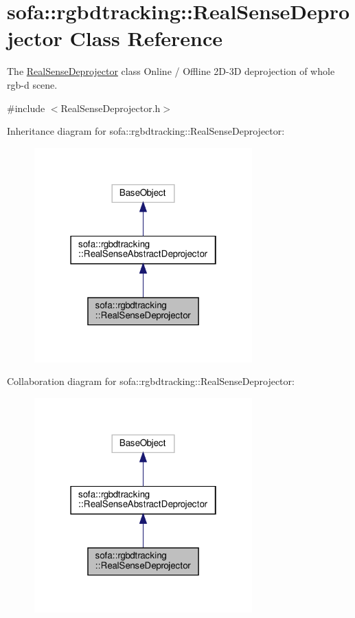 \hypertarget{classsofa_1_1rgbdtracking_1_1_real_sense_deprojector}{}\section{sofa\+:\+:rgbdtracking\+:\+:Real\+Sense\+Deprojector Class Reference}
\label{classsofa_1_1rgbdtracking_1_1_real_sense_deprojector}


The \hyperlink{classsofa_1_1rgbdtracking_1_1_real_sense_deprojector}{Real\+Sense\+Deprojector} class Online / Offline 2\+D-\/3D deprojection of whole rgb-\/d scene.  




{\ttfamily \#include $<$Real\+Sense\+Deprojector.\+h$>$}



Inheritance diagram for sofa\+:\+:rgbdtracking\+:\+:Real\+Sense\+Deprojector\+:
\nopagebreak
\begin{figure}[H]
\begin{center}
\leavevmode
\includegraphics[width=238pt]{classsofa_1_1rgbdtracking_1_1_real_sense_deprojector__inherit__graph}
\end{center}
\end{figure}


Collaboration diagram for sofa\+:\+:rgbdtracking\+:\+:Real\+Sense\+Deprojector\+:
\nopagebreak
\begin{figure}[H]
\begin{center}
\leavevmode
\includegraphics[width=238pt]{classsofa_1_1rgbdtracking_1_1_real_sense_deprojector__coll__graph}
\end{center}
\end{figure}

